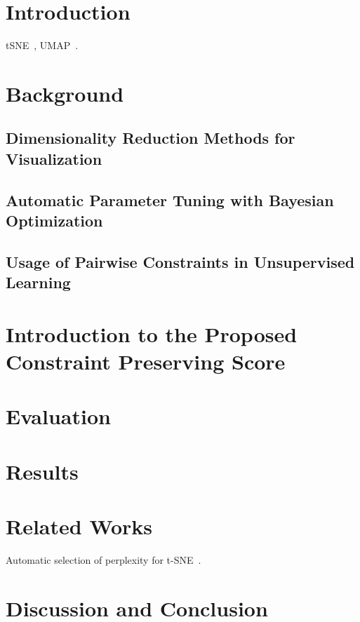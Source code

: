 \section{Introduction}

tSNE~\cite{maaten2008tsne}, UMAP~\cite{mcinnes2018umap}.



\section{Background}

\subsection{Dimensionality Reduction Methods for Visualization}

\subsection{Automatic Parameter Tuning with Bayesian Optimization}

\subsection{Usage of Pairwise Constraints in Unsupervised Learning}



\section{Introduction to the Proposed Constraint Preserving Score}



\section{Evaluation}



\section{Results}



\section{Related Works}
Automatic selection of perplexity for t-SNE~\cite{cao2017automatic}.


\section{Discussion and Conclusion}
